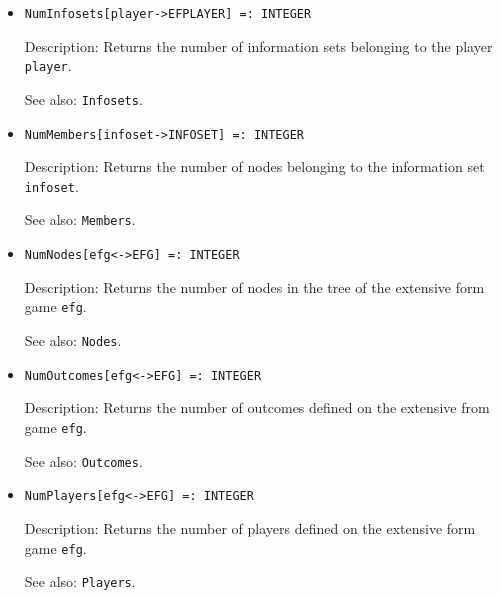\begin{itemize}
\item
\protect \large \begin{verbatim}
NumInfosets[player->EFPLAYER] =: INTEGER
\end{verbatim}\normalsize

\bd
\item
[Description:] Returns the number of information sets belonging to the
player \verb+player+.
\item
[See also:] {\tt Infosets}.
\ed

\item
\protect \large \begin{verbatim}
NumMembers[infoset->INFOSET] =: INTEGER
\end{verbatim}\normalsize

\bd
\item
[Description:] Returns the number of nodes belonging to the information
set \verb+infoset+.
\item
[See also:] {\tt Members}.
\ed

\item
\protect \large \begin{verbatim}
NumNodes[efg<->EFG] =: INTEGER
\end{verbatim}\normalsize

\bd
\item
[Description:] Returns the number of nodes in the tree of the extensive form
game \verb+efg+.
\item
[See also:] {\tt Nodes}.
\ed

\item
\protect \large \begin{verbatim}
NumOutcomes[efg<->EFG] =: INTEGER
\end{verbatim} \normalsize

\bd
\item
[Description:] Returns the number of outcomes defined on the extensive from
game \verb+efg+.
\item
[See also:] {\tt Outcomes}.
\ed

\item
\protect \large \begin{verbatim}
NumPlayers[efg<->EFG] =: INTEGER
\end{verbatim} \normalsize

\bd
\item
[Description:] Returns the number of players defined on the extensive form
game \verb+efg+.
\item
[See also:] {\tt Players}.
\ed


\end{itemize}
